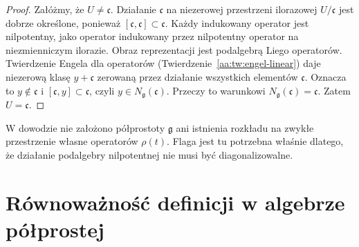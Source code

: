 \begin{proof}
Załóżmy, że $U\ne\mathfrak c$. Działanie $\mathfrak c$ na niezerowej przestrzeni ilorazowej $U/\mathfrak c$ jest dobrze określone, ponieważ $[\mathfrak c,\mathfrak c]\subset\mathfrak c$. Każdy indukowany operator jest nilpotentny, jako operator indukowany przez nilpotentny operator na niezmienniczym ilorazie. Obraz reprezentacji jest podalgebrą Liego operatorów. Twierdzenie Engela dla operatorów (Twierdzenie~\ref{aa:tw:engel-linear}) daje niezerową klasę $y+\mathfrak c$ zerowaną przez działanie wszystkich elementów $\mathfrak c$. Oznacza to $y\notin\mathfrak c$ i $[\mathfrak c,y]\subset\mathfrak c$, czyli $y\in N_{\mathfrak g}(\mathfrak c)$. Przeczy to warunkowi $N_{\mathfrak g}(\mathfrak c)=\mathfrak c$. Zatem $U=\mathfrak c$.
\end{proof}

W dowodzie nie założono półprostoty $\mathfrak g$ ani istnienia rozkładu na zwykłe przestrzenie własne operatorów $\rho(t)$. Flaga jest tu potrzebna właśnie dlatego, że działanie podalgebry nilpotentnej nie musi być diagonalizowalne.

\section{Równoważność definicji w algebrze półprostej}

